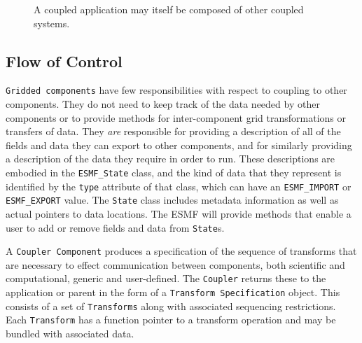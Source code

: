 \begin{figure}
\caption[{Scoping of Components in a Coupled Application}]{A coupled
application may itself be composed of other coupled systems.}
\label{fig:couplerscaling}
\end{figure}

\subsection{Flow of Control}
\label{sec:controlflow}
{\tt Gridded components} have few responsibilities with respect to coupling
to other components.  They do not need to keep track of the data needed
by other components or to provide methods for inter-component 
grid transformations or transfers of data.  They {\it are} responsible for 
providing a description of all of the fields and data they
can export to other components, and for similarly providing a description 
of the data they require in order to run.  These descriptions are
embodied in the {\tt ESMF\_State} class, and the kind of data that they 
represent is identified by the {\tt type} attribute of that class, which can
have an {\tt ESMF\_IMPORT} or {\tt ESMF\_EXPORT} value.  The {\tt State} class
includes metadata information as well as actual pointers to data 
locations.  The ESMF will provide methods that enable a user to add or
remove fields and data from {\tt State}s.  

A {\tt Coupler Component} produces a specification of the sequence of 
transforms that are necessary to effect communication between components, 
both scientific and computational, generic and user-defined.  The {\tt Coupler} 
returns these to the application or parent in the form of a 
{\tt Transform Specification} object.  This consists of a set of {\tt Transforms} 
along with associated sequencing restrictions.  Each {\tt Transform} has a
function pointer to a transform operation and may be bundled with 
associated data.

